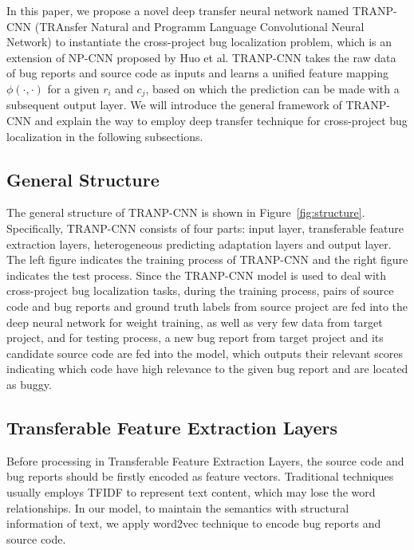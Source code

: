 In this paper, we propose a novel deep transfer neural network named TRANP-CNN (TRAnsfer Natural and Programm Language Convolutional Neural Network) to instantiate the cross-project bug localization problem, which is an extension of NP-CNN proposed by Huo et al. TRANP-CNN takes the raw data of bug reports and source code as inputs and learns a unified feature mapping $\phi(\cdot, \cdot)$ for a given $r_i$ and $c_j$, based on which the prediction can be made with a subsequent output layer. We will introduce the general framework of TRANP-CNN and explain the way to employ deep transfer technique for cross-project bug localization in the following subsections.

\subsection{General Structure}
The general structure of TRANP-CNN is shown in Figure~\ref{fig:structure}. Specifically, TRANP-CNN consists of four parts: input layer, transferable feature extraction layers, heterogeneous predicting adaptation layers and output layer. The left figure indicates the training process of TRANP-CNN and the right figure indicates the test process. Since the TRANP-CNN model is used to deal with cross-project bug localization tasks, during the training process, pairs of source code and bug reports and ground truth labels from source project are fed into the deep neural network for weight training, as well as very few data from target project, and for testing process, a new bug report from target project and its candidate source code are fed into the model, which outputs their relevant scores indicating which code have high relevance to the given bug report and are located as buggy.



\subsection{Transferable Feature Extraction Layers}
Before processing in Transferable Feature Extraction Layers, the source code and bug reports should be firstly encoded as feature vectors. Traditional techniques usually employs TFIDF to represent text content, which may lose the word relationships. In our model, to maintain the semantics with structural information of text, we apply word2vec technique to encode bug reports and source code.

